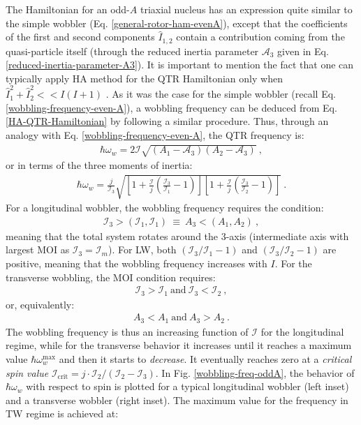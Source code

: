 The Hamiltonian for an odd-$A$ triaxial nucleus has an expression quite similar to the simple wobbler (Eq. \ref{general-rotor-ham-evenA}), except that the coefficients of the first and second components $\hat{I}_{1,2}$ contain a contribution coming from the quasi-particle itself (through the reduced inertia parameter $\mathscr{A}_3$ given in Eq. \ref{reduced-inertia-parameter-A3}). It is important to mention the fact that one can typically apply HA method for the QTR Hamiltonian only when $\hat{I}_1^2+\hat{I}_2^2<<I(I+1)$ \cite{bohr1998nuclear,frauendorf2014transverse}. As it was the case for the simple wobbler (recall Eq. \ref{wobbling-frequency-even-A}), a wobbling frequency can be deduced from Eq. \ref{HA-QTR-Hamiltonian} by following a similar procedure. Thus, through an analogy with Eq. \ref{wobbling-frequency-even-A}, the QTR frequency is:
\begin{align}
    \hbar\omega_w=2\mathscr{I}\sqrt{\left(A_1-\mathscr{A}_3\right)\left(A_2-\mathscr{A}_3\right)}\ ,
    \label{wobbling-frequency-odd-A-inertiaParams}
\end{align}
or in terms of the three moments of inertia:
\begin{align}
    \hbar\omega_w=\frac{j}{\mathcal{I}_3}\sqrt{\left[1+\frac{\mathscr{I}}{j}\left(\frac{\mathcal{I}_3}{\mathcal{I}_1}-1\right)\right]\left[1+\frac{\mathscr{I}}{j}\left(\frac{\mathcal{I}_3}{\mathcal{I}_2}-1\right)\right]}\ .
    \label{wobbling-frequency-odd-A-MOI}
\end{align}
For a longitudinal wobbler, the wobbling frequency requires the condition:
\begin{align}
    \mathcal{I}_3>(\mathcal{I}_1,\mathcal{I}_1)\ \equiv\ A_3<(A_1,A_2)\ ,
\end{align}
meaning that the total system rotates around the $3$-axis (intermediate axis with largest MOI as $\mathcal{I}_3=\mathcal{I}_m$). For LW, both $(\mathcal{I}_3/\mathcal{I}_1-1)$ and $(\mathcal{I}_3/\mathcal{I}_2-1)$ are positive, meaning that the wobbling frequency increases with $I$.
For the transverse wobbling, the MOI condition requires:
\begin{align}
    \mathcal{I}_3>\mathcal{I}_1\ \text{and}\ \mathcal{I}_3<\mathcal{I}_2\ ,
\end{align}
or, equivalently:
\begin{align}
    A_3<A_1\ \text{and}\ A_3>A_2\ .
\end{align}
The wobbling frequency is thus an increasing function of $\mathscr{I}$ for the longitudinal regime, while for the transverse behavior it increases until it reaches a maximum value $\hbar\omega_w^\text{max}$ and then it starts to \emph{decrease}. It eventually reaches zero at a \emph{critical spin value} $\mathscr{I}_\text{crit}=j\cdot\mathcal{I}_2/(\mathcal{I}_2-\mathcal{I}_3)$. In Fig. \ref{wobbling-freq-oddA}, the behavior of $\hbar\omega_w$ with respect to spin is plotted for a typical longitudinal wobbler (left inset) and a transverse wobbler (right inset). The maximum value for the frequency in TW regime is achieved at:
